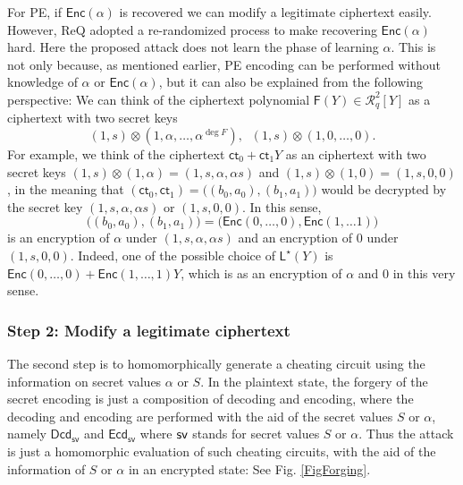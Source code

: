 \documentclass[runningheads]{llncs}
\newcommand{\cc}[1]{\mathcal{#1}} %
\newcommand{\ct}{\textsf{ct}{}}
\newcommand{\PE}{\textsf{PE}{}}
\newcommand{\REQ}{\textsf{ReQ}}
\newcommand{\enc}{\textsf{Enc}}
\newcommand{\dhnote}[1]{{ }\textcolor{red}{[NOTE: {#1}]}}
\begin{document}
        For \PE, if $\enc(\alpha)$ is recovered we can modify a legitimate ciphertext easily. However, \REQ{} adopted a re-randomized process to make recovering $\enc(\alpha)$ hard. Here the proposed attack does not learn the phase of learning $\alpha$. This is not only because, as mentioned earlier, \PE{} encoding can be performed without knowledge of $\alpha$ or $\enc(\alpha)$, but it can also be explained from the following perspective:
        We can think of the ciphertext polynomial $\mathsf F(Y)\in \cc R^2_q[Y]$ as a ciphertext with two secret keys $$(1,s)\otimes(1,\alpha,\dots,\alpha^{\deg F}), \;\;(1,s)\otimes(1,0,\dots,0).$$ 
        For example, we think of the ciphertext $\ct_0+\ct_1Y$ as an ciphertext with two secret keys $(1,s)\otimes(1,\alpha)=(1,s,\alpha,\alpha s)$ and $(1,s)\otimes(1,0)=(1,s,0,0)$, in the meaning that $(\ct_0,\ct_1)=\big((b_0,a_0),(b_1,a_1)\big)$ would be decrypted by the secret key $(1,s,\alpha,\alpha s)$ or $(1,s,0,0)$. 
        In this sense, 
        $$\big((b_0,a_0),(b_1,a_1)\big)=\big(\enc(0,\dots,0),\enc(1,\dots 1)\big)$$
        is an encryption of $\alpha$ under $(1,s,\alpha,\alpha s)$ and an encryption of $0$ under $(1,s,0,0)$.
        Indeed, one of the possible choice of $\mathsf L^\star(Y)$ is $\enc(0,\dots,0)+\enc(1,\dots, 1)Y$, which is as an encryption of $\alpha$ and $0$ in this very sense.
        

        \subsubsection{Step 2: Modify a legitimate ciphertext}
        The second step is to homomorphically generate a cheating circuit using the information on secret values $\alpha$ or $S$.
        In the plaintext state, the forgery of the secret encoding is just a composition of decoding and encoding, where the decoding and encoding are performed with the aid of the secret values $S$ or $\alpha$, namely $\mathsf{Dcd_{sv}}$ and $\mathsf{Ecd_{sv}}$ where ${\sf sv}$ stands for secret values $S$ or $\alpha$. 
        Thus the attack is just a homomorphic evaluation of such cheating circuits, with the aid of the information of $S$ or $\alpha$ in an  encrypted state: 
        See Fig. \ref{FigForging}.
        
\end{document}
